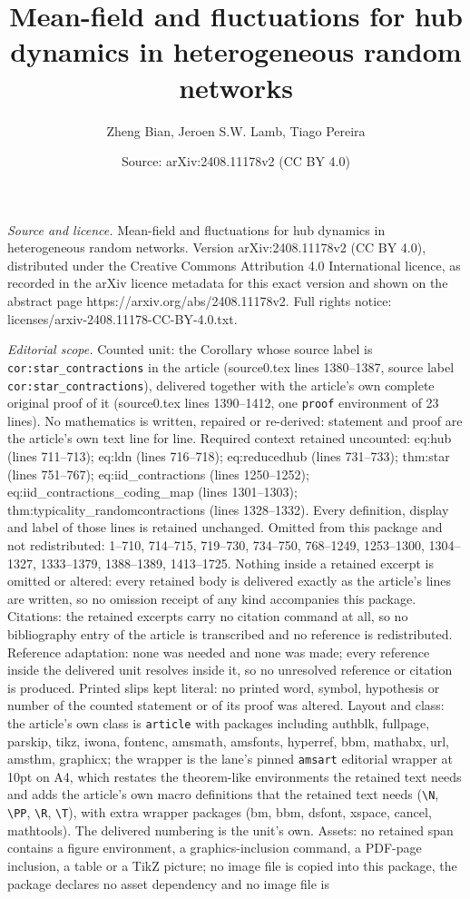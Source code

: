 \documentclass[10pt,a4paper]{amsart}
\title[Mean-field and fluctuations for hub dynamics in heterogeneou]{Mean-field and fluctuations for hub dynamics in heterogeneous random networks}
\author{Zheng Bian, Jeroen S.W. Lamb, Tiago Pereira}
\date{Source: arXiv:2408.11178v2 (CC BY 4.0)}
\begin{document}
\maketitle

\noindent\emph{Source and licence.} Mean-field and fluctuations for hub dynamics in heterogeneous random networks. Version arXiv:2408.11178v2 (CC BY 4.0), distributed under the Creative Commons Attribution 4.0 International licence, as recorded in the arXiv licence metadata for this exact version and shown on the abstract page https://arxiv.org/abs/2408.11178v2. Full rights notice: licenses/arxiv-2408.11178-CC-BY-4.0.txt.\par\smallskip

\noindent\textit{Editorial scope.} Counted unit: the Corollary whose source label is \texttt{cor:star\_contractions} in the article (source0.tex lines 1380--1387, source label \texttt{cor:star\_contractions}), delivered together with the article's own complete original proof of it (source0.tex lines 1390--1412, one \texttt{proof} environment of 23 lines). No mathematics is written, repaired or re-derived: statement and proof are the article's own text line for line. Required context retained uncounted: eq:hub (lines 711--713); eq:ldn (lines 716--718); eq:reducedhub (lines 731--733); thm:star (lines 751--767); eq:iid\_contractions (lines 1250--1252); eq:iid\_contractions\_coding\_map (lines 1301--1303); thm:typicality\_randomcontractions (lines 1328--1332). Every definition, display and label of those lines is retained unchanged. Omitted from this package and not redistributed: 1--710, 714--715, 719--730, 734--750, 768--1249, 1253--1300, 1304--1327, 1333--1379, 1388--1389, 1413--1725. Nothing inside a retained excerpt is omitted or altered: every retained body is delivered exactly as the article's lines are written, so no omission receipt of any kind accompanies this package. Citations: the retained excerpts carry no citation command at all, so no bibliography entry of the article is transcribed and no reference is redistributed. Reference adaptation: none was needed and none was made; every reference inside the delivered unit resolves inside it, so no unresolved reference or citation is produced. Printed slips kept literal: no printed word, symbol, hypothesis or number of the counted statement or of its proof was altered. Layout and class: the article's own class is \texttt{article} with packages including authblk, fullpage, parskip, tikz, iwona, fontenc, amsmath, amsfonts, hyperref, bbm, mathabx, url, amsthm, graphicx; the wrapper is the lane's pinned \texttt{amsart} editorial wrapper at 10pt on A4, which restates the theorem-like environments the retained text needs and adds the article's own macro definitions that the retained text needs (\texttt{\textbackslash N}, \texttt{\textbackslash PP}, \texttt{\textbackslash R}, \texttt{\textbackslash T}), with extra wrapper packages (bm, bbm, dsfont, xspace, cancel, mathtools). The delivered numbering is the unit's own. Assets: no retained span contains a figure environment, a graphics-inclusion command, a PDF-page inclusion, a table or a TikZ picture; no image file is copied into this package, the package declares no asset dependency and no image file is 
\end{document}
